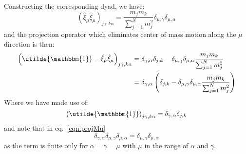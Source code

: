 \documentclass[letter,11pt]{article}
\newcommand{\cvec}[1]{\utilde{#1}}
\newcommand{\laeq}[1]{\label{eqn:#1}}
\newcommand{\refeq}[1]{eq.~\ref{eqn:#1}}
\begin{document}
Constructing the corresponding dyad, we have:
\begin{equation}\laeq{dyad:xixi}
  {\left( \hat{\xi}_{\mu}\hat{\xi}_{\mu} \right)}_{j\gamma,k\alpha} = \frac{m_j m_k}{\sum_{j=1}^N m_j^2}\delta_{\mu,\gamma}\delta_{\mu,\alpha}
\end{equation}
and the projection operator which eliminates center of mass motion along the $\mu$ direction is then:
\begin{align}\laeq{projMu}
  {\left( \cvec{\mathbbm{1}} - \hat{\xi}_{\mu}\hat{\xi}_{\mu} \right)}_{j\gamma,k\alpha}
  &= \delta_{\gamma,\alpha} \delta_{j,k} - \delta_{\mu,\gamma}\delta_{\mu,\alpha} \frac{m_j m_k}{\sum_{j=1}^N m_j^2}  \\
  &= \delta_{\gamma,\alpha} \left(\delta_{j,k} - \delta_{\mu,\gamma}\delta_{\mu,\alpha} \frac{m_j m_k}{\sum_{j=1}^N m_j^2} \right)
\end{align}
Where we have made use of:
\[
  {\left( \cvec{\mathbbm{1}} \right)}_{{j\gamma,k\alpha}} = \delta_{\gamma,\alpha} \delta_{j,k}
\]
and note that in \refeq{projMu}
\[
  \delta_{\gamma,\alpha} \delta_{\mu,\gamma} \delta_{\mu,\alpha} = \delta_{\mu,\gamma} \delta_{\mu,\alpha}
\]
as the term is finite only for $\alpha = \gamma = \mu$ with $\mu$ in the range of $\alpha$ and $\gamma$.
\end{document}
